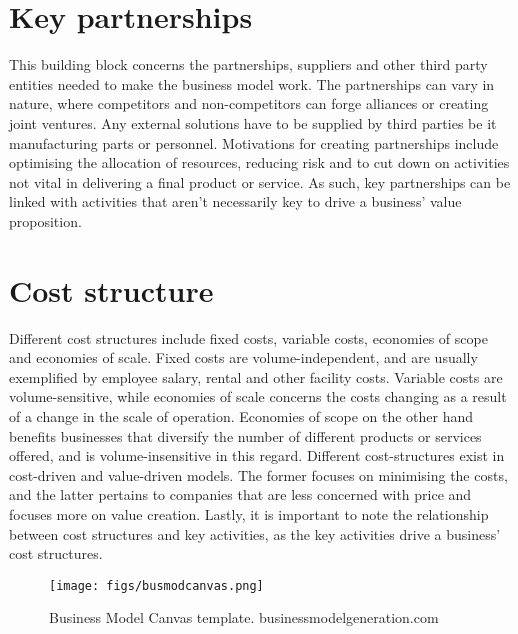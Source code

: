 \section{Key partnerships}
This building block concerns the partnerships, suppliers and other third party entities needed to make the business model work. The partnerships can vary in nature, where competitors and non-competitors can forge alliances or creating joint ventures. Any external solutions have to be supplied by third parties be it manufacturing parts or personnel. Motivations for creating partnerships include optimising the allocation of resources, reducing risk and to cut down on activities not vital in delivering a final product or service. As such, key partnerships can be linked with activities that aren't necessarily key to drive a business' value proposition. 

\section{Cost structure}
Different cost structures include fixed costs, variable costs, economies of scope and economies of scale. Fixed costs are volume-independent, and are usually exemplified by employee salary, rental and other facility costs. Variable costs are volume-sensitive, while economies of scale concerns the costs changing as a result of a change in the scale of operation. Economies of scope on the other hand benefits businesses that diversify the number of different products or services offered, and is volume-insensitive in this regard. Different cost-structures exist in cost-driven and value-driven models. The former focuses on minimising the costs, and the latter pertains to companies that are less concerned with price and focuses more on value creation.
Lastly, it is important to note the relationship between cost structures and key activities, as the key activities drive a business' cost structures. 

\begin{figure}[]
    \centering
    \texttt{[image: figs/busmodcanvas.png]}
    \caption{Business Model Canvas template. \textcopyright businessmodelgeneration.com}
    \label{fig:businessmodelcanvas}
\end{figure}